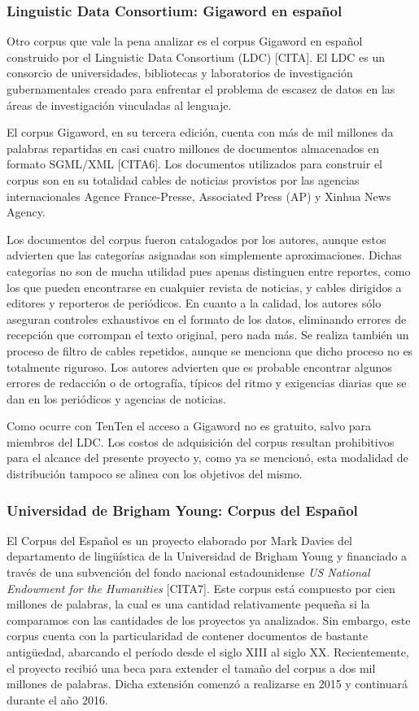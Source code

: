 \subsubsection{Linguistic Data Consortium: Gigaword en español}

Otro corpus que vale la pena analizar es el corpus Gigaword en español construido por el Linguistic Data
Consortium (LDC) [CITA]. El LDC es un consorcio de universidades, bibliotecas y laboratorios de
investigación gubernamentales creado para enfrentar el problema de escasez de datos en las áreas de
investigación vinculadas al lenguaje.

El corpus Gigaword, en su tercera edición, cuenta con más de mil millones da palabras repartidas en casi
cuatro millones de documentos almacenados en formato SGML/XML [CITA6]. Los documentos utilizados para
construir el corpus son en su totalidad cables de noticias provistos por las agencias internacionales
Agence France-Presse, Associated Press (AP) y Xinhua News Agency.

Los documentos del corpus fueron catalogados por los autores, aunque estos advierten que las categorías
asignadas son simplemente aproximaciones. Dichas categorías no son de mucha utilidad pues apenas
distinguen entre reportes, como los que pueden encontrarse en cualquier revista de noticias, y cables
dirigidos a editores y reporteros de periódicos. En cuanto a la calidad, los autores sólo aseguran
controles exhaustivos en el formato de los datos, eliminando errores de recepción que corrompan el
texto original, pero nada más. Se realiza también un proceso de filtro de cables repetidos, aunque se
menciona que dicho proceso no es totalmente riguroso. Los autores advierten que es probable encontrar
algunos errores de redacción o de ortografía, típicos del ritmo y exigencias diarias que se dan en los
periódicos y agencias de noticias.

Como ocurre con TenTen el acceso a Gigaword no es gratuito, salvo para miembros del LDC. Los costos de
adquisición del corpus resultan prohibitivos para el alcance del presente proyecto y, como ya se mencionó,
esta modalidad de distribución tampoco se alinea con los objetivos del mismo.

\subsubsection{Universidad de Brigham Young: Corpus del Español}

El Corpus del Español es un proyecto elaborado por Mark Davies del departamento de lingüística de
la Universidad de Brigham Young y financiado a través de una subvención del fondo nacional
estadounidense \textit{US National Endowment for the Humanities} [CITA7]. Este corpus está compuesto
por cien millones de palabras, la cual es una cantidad relativamente pequeña si la comparamos con las
cantidades de los proyectos ya analizados. Sin embargo,  este corpus cuenta con la particularidad de
contener documentos de bastante antigüedad, abarcando el período desde el siglo XIII al siglo XX.
Recientemente, el proyecto recibió una beca para extender el tamaño del corpus a dos mil millones de
palabras. Dicha extensión comenzó a realizarse en 2015 y continuará durante el año 2016.

